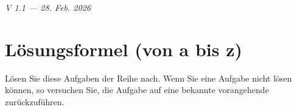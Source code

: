 %


\renewcommand{\bbwAufgabenBlockID}{GlQuad}

\ifisNURAUFGABEN
\newcommand{\LoesungsBlock}[1]{\TRAINER{#1%
\vspace{1mm}
\hrule}}%
\else
\newcommand{\LoesungsBlock}[1]{\noTRAINER{\TNTeop{}}\TRAINER{#1%
\vspace{1mm}
\hrule}}%
\fi

\renewcommand{\metaHeaderLine}{Arbeitsblatt Quadratische Gleichungen}
\renewcommand{\arbeitsblattTitel}{Quadratische Gleichungen: Aufgaben}

\newcommand{\TNTeopS}[1]{\TRAINER{#1}\noTRAINER{\TNTeop{}}}

\arbeitsblattHeader{}

\begin{center}\textit{\tiny{V 1.1 --- 28. Feb. 2026}}\end{center}

\tableofcontents{}

\newpage

\section{Lösungsformel (von a bis z)}
Lösen Sie diese Aufgaben der Reihe nach. Wenn Sie eine Aufgabe nicht lösen können, so versuchen Sie, die Aufgabe auf eine bekannte vorangehende zurückzuführen.



